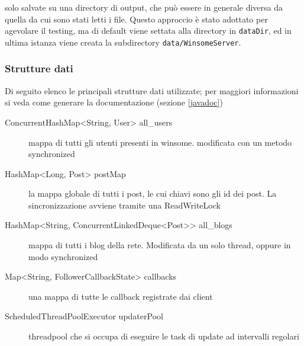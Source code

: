 solo salvate su una directory di output, che può essere in generale diversa da quella da cui sono stati letti i file. 
Questo approccio è stato adottato per agevolare il testing, ma di default viene settata alla directory in \verb|dataDir|, ed in ultima istanza viene creata la subdirectory \verb|data/WinsomeServer|.

\subsubsection{Strutture dati}
Di seguito elenco le principali strutture dati utilizzate; per maggiori informazioni si veda come generare la documentazione (sezione \ref{javadoc})

\begin{description}
	\item[ConcurrentHashMap<String, User> all\_users] mappa di tutti gli utenti presenti in winsome. modificata con un metodo synchronized
	\item[HashMap<Long, Post> postMap] la mappa globale di tutti i post, le cui chiavi sono gli id dei post. La sincronizzazione avviene tramite una ReadWriteLock
	\item[HashMap<String, ConcurrentLinkedDeque<Post>> all\_blogs] mappa di tutti i blog della rete. Modificata da un solo thread, oppure in modo synchronized
	\item[Map<String, FollowerCallbackState> callbacks] una mappa di tutte le callback registrate dai client
	\item[ScheduledThreadPoolExecutor updaterPool] threadpool che si occupa di eseguire le task di update ad intervalli regolari
\end{description}